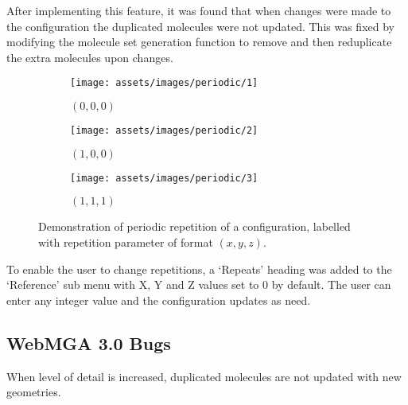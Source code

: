 After implementing this feature, it was found that when changes were made to the configuration the duplicated molecules were not updated. This was fixed by modifying the molecule set generation function to remove and then reduplicate the extra molecules upon changes.

\begin{figure}
  \begin{center}
    \begin{subfigure}{0.3\textwidth}
      \texttt{[image: assets/images/periodic/1]}
      \caption{$(0,0,0)$}
      \label{fig:periodic_1}
    \end{subfigure}
        \begin{subfigure}{0.3\textwidth}
      \texttt{[image: assets/images/periodic/2]}
      \caption{$(1,0,0)$}
      \label{fig:periodic_2}
    \end{subfigure}
        \begin{subfigure}{0.3\textwidth}
      \texttt{[image: assets/images/periodic/3]}
      \caption{$(1,1,1)$}
      \label{fig:periodic_3}
    \end{subfigure}
  \end{center}
  \caption{Demonstration of periodic repetition of a configuration, labelled with repetition parameter of format $(x, y, z)$.}
  \label{fig:periodic}
\end{figure}

To enable the user to change repetitions, a `Repeats' heading was added to the `Reference' sub menu with X, Y and Z values set to 0 by default. The user can enter any integer value and the configuration updates as need.

\subsection{WebMGA 3.0 Bugs}
When level of detail is increased, duplicated molecules are not updated with new geometries.
